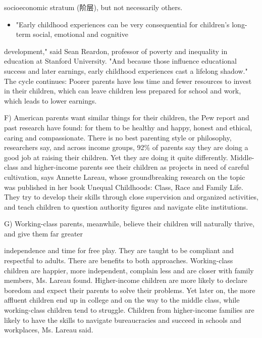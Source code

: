 \documentclass[UTF8,11pt]{ctexart}
\begin{document}
socioeconomic stratum (阶层), but not necessarily others.


\begin{itemize}[leftmargin=2em,itemsep=.2em,topsep=.4em]\item[E.] "Early childhood experiences can be very consequential for children's long-term social, emotional and cognitive
\end{itemize}

development," said Sean Reardon, professor of poverty and inequality in education at Stanford University. "And because those influence educational success and later earnings, early childhood experiences cast a lifelong shadow." The cycle continues: Poorer parents have less time and fewer resources to invest in their children, which can leave children less prepared for school and work, which leads to lower earnings.


F) American parents want similar things for their children, the Pew report and past research have found: for them to be healthy and happy, honest and ethical, caring and compassionate. There is no best parenting style or philosophy, researchers say, and across income groups, 92\% of parents say they are doing a good job at raising their children. Yet they are doing it quite differently. Middle-class and higher-income parents see their children as projects in need of careful cultivation, says Annette Lareau, whose groundbreaking research on the topic was published in her book Unequal Childhoods: Class, Race and Family Life. They try to develop their skills through close supervision and organized activities, and teach children to question authority figures and navigate elite institutions.


G) Working-class parents, meanwhile, believe their children will naturally thrive, and give them far greater


independence and time for free play. They are taught to be compliant and respectful to adults. There are benefits to both approaches. Working-class children are happier, more independent, complain less and are closer with family members, Ms. Lareau found. Higher-income children are more likely to declare boredom and expect their parents to solve their problems. Yet later on, the more affluent children end up in college and on the way to the middle class, while working-class children tend to struggle. Children from higher-income families are likely to have the skills to navigate bureaucracies and succeed in schools and workplaces, Ms. Lareau said.
\end{document}
